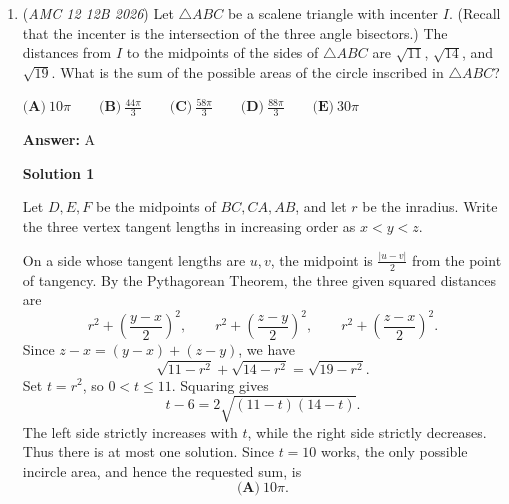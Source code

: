 \begin{enumerate}
 
 \[2^{200} - 1 \pmod{125}\]

 Since $\gcd(2, 125) = 1$, \href{https://artofproblemsolving.com/wiki/index.php?title=Euler\%27s\_Totient\_Theorem}{Euler's Totient Theorem} can be applied to solve this:

 
 \[2^{\phi(125)} \equiv 2^{100} \equiv 1 \pmod{125},\]so
 \[\left(2^{100}\right)^2-1 \equiv 1^2-1 \equiv 0 \pmod{125}\]

 Finding $2^{200} - 1 \pmod{8}$ is trivial since $2^{200} \equiv 0 \pmod{8}$. Therefore, $2^{200} - 1 \equiv -1 \pmod{8}$. The final step is finding a number that is congruent to $0 \pmod{125}$ and $-1 \pmod{8}$.

 Testing out values:
 \[0, 125, 250, \textbf{375}, 500, 625, 750, 875 \implies \boxed{\textbf{(C)}\ 375}\]



	\item (\textit{AMC 12 12B 2026}) Let $\triangle ABC$ be a scalene triangle with incenter $I$. (Recall that the incenter is the intersection of the three angle bisectors.) The distances from $I$ to the midpoints of the sides of $\triangle ABC$ are $\sqrt{11}$, $\sqrt{14}$, and $\sqrt{19}$. What is the sum of the possible areas of the circle inscribed in $\triangle ABC$?


 $\textbf{(A)}\   10 \pi  \qquad                 \textbf{(B)}\   \frac{44 \pi}{3}  \qquad                 \textbf{(C)}\   \frac{58 \pi}{3}  \qquad                 \textbf{(D)}\   \frac{88 \pi}{3}  \qquad                 \textbf{(E)}\   30 \pi$

 \textbf{Answer: }A



\textbf{Solution 1}

Let $D,E,F$ be the midpoints of $BC,CA,AB$, and let $r$ be the inradius. Write the three vertex tangent lengths in increasing order as $x<y<z$.

 On a side whose tangent lengths are $u,v$, the midpoint is $\frac{|u-v|}{2}$ from the point of tangency. By the Pythagorean Theorem, the three given squared distances are
 \[r^2+\left(\frac{y-x}{2}\right)^2,\qquad r^2+\left(\frac{z-y}{2}\right)^2,\qquad r^2+\left(\frac{z-x}{2}\right)^2.\]Since $z-x=(y-x)+(z-y)$, we have
 \[\sqrt{11-r^2}+\sqrt{14-r^2}=\sqrt{19-r^2}.\]Set $t=r^2$, so $0<t\le11$. Squaring gives
 \[t-6=2\sqrt{(11-t)(14-t)}.\]The left side strictly increases with $t$, while the right side strictly decreases. Thus there is at most one solution. Since $t=10$ works, the only possible incircle area, and hence the requested sum, is
 \[\boxed{\textbf{(A)}\ 10\pi}.\]


\end{enumerate}
